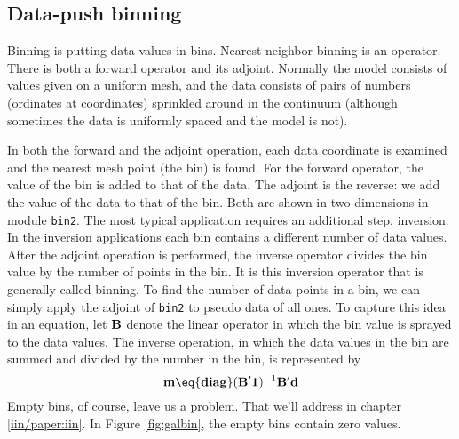 \subsection{Data-push binning}
Binning is putting data values in bins.
Nearest-neighbor binning is an operator.
There is both a forward operator and its adjoint.
Normally the model consists of values given on a uniform mesh,
and the data consists of pairs of numbers (ordinates at coordinates)
sprinkled around in the continuum
(although sometimes the data is uniformly spaced and the model is not).
\par
In both the forward and the adjoint operation,
each data coordinate is examined
and the nearest mesh point (the bin) is found.
For the forward operator,
the value of the bin is added to that of the data.
The adjoint is the reverse:
we add the value of the data to that of the bin.
Both are shown in two dimensions in module \texttt{bin2}.
The most typical application requires an additional step, inversion.
In the inversion applications
each bin contains a different number of data values.
After the adjoint operation is performed,
the inverse operator divides the bin value
by the number of points in the bin.
It is this inversion operator that is generally called binning.
To find the number of data points in a bin,
we can simply apply the adjoint of \texttt{bin2} to pseudo data of all ones.
To capture this idea in an equation,
let $\bold B$ denote the linear operator
in which the bin value is sprayed to the data values.
The inverse operation,
in which the data values in the bin are summed
and divided by the number in the bin, is represented by
\begin{equation}
\bold m \eq {\bf diag}( \bold B' \bold 1)^{-1} \bold B' \bold d
\label{eqn:dpbin}
\end{equation}
Empty bins, of course, leave us a problem.
That we'll address in chapter \ref{iin/paper:iin}.
In Figure \ref{fig:galbin}, the empty bins contain zero values.

